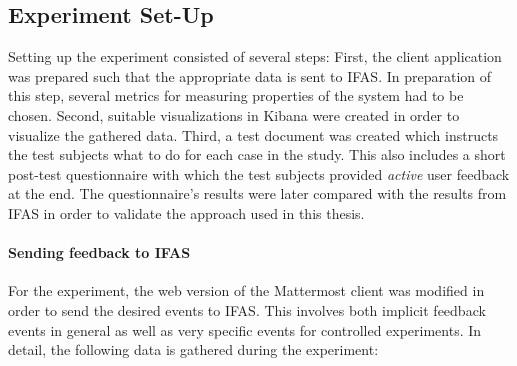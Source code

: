 \subsection{Experiment Set-Up}

Setting up the experiment consisted of several steps:
First, the client application was prepared such that the appropriate data is sent to \ac{IFAS}.
In preparation of this step, several metrics for measuring properties of the system had to be chosen.
Second, suitable visualizations in Kibana were created in order to visualize the gathered data.
Third, a test document was created which instructs the test subjects what to do for each case in the study.
This also includes a short post-test questionnaire with which the test subjects provided \emph{active} user feedback at the end.
The questionnaire's results were later compared with the results from \ac{IFAS} in order to validate the approach used in this thesis.

\paragraph{Sending feedback to IFAS}

For the experiment, the web version of the Mattermost client was modified in order to send the desired events to \ac{IFAS}.
This involves both implicit feedback events in general as well as very specific events for controlled experiments.
In detail, the following data is gathered during the experiment:

